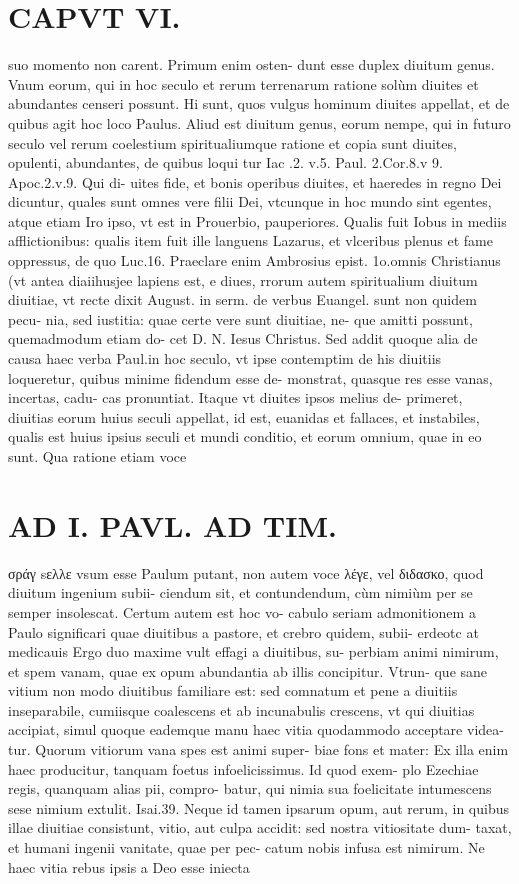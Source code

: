 \documentclass{article}
\begin{document}
\begin{pages}
\section*{CAPVT  VI. }
\marginpar{[ p.495 ]}\pstart suo momento non carent. Primum enim osten- dunt esse duplex diuitum genus. Vnum eorum, qui in hoc seculo et rerum terrenarum ratione solùm diuites et abundantes censeri possunt. Hi sunt, quos vulgus hominum diuites appellat, et de quibus agit hoc loco Paulus. Aliud est diuitum genus, eorum nempe, qui in futuro seculo vel rerum coelestium spiritualiumque  ratione et copia sunt diuites, opulenti, abundantes, de quibus loqui tur Iac .2. v.5. Paul. 2.Cor.8.v 9. Apoc.2.v.9. Qui di- uites fide, et bonis operibus diuites, et haeredes in regno Dei dicuntur, quales sunt omnes vere filii Dei, vtcunque in hoc mundo sint egentes, atque etiam Iro ipso, vt est in Prouerbio, pauperiores. Qualis fuit Iobus in mediis afflictionibus: qualis item fuit ille languens Lazarus, et vlceribus plenus et fame oppressus, de quo Luc.16. Praeclare enim Ambrosius epist. 1o.omnis Christianus (vt antea diaiihusjee lapiens est, e diues, rrorum autem spiritualium diuitum diuitiae, vt recte dixit August. in serm. de verbus  Euangel. sunt non quidem pecu- nia, sed iustitia: quae certe vere sunt diuitiae, ne- que amitti possunt, quemadmodum etiam do- cet D. N. Iesus Christus.  \pend\pstart Sed addit quoque alia de causa haec verba Paul.in hoc seculo, vt ipse contemptim de his diuitiis loqueretur, quibus minime fidendum esse de- monstrat, quasque res esse vanas, incertas, cadu- cas pronuntiat. Itaque vt diuites ipsos melius de- primeret, diuitias eorum huius seculi appellat, id est, euanidas et fallaces, et instabiles, qualis est huius ipsius seculi et mundi conditio, et eorum omnium, quae in eo sunt. Qua ratione etiam voce  \pend
\section*{AD I. PAVL. AD TIM. }
\marginpar{[ p.490 ]}\pstart σράγ sελλε vsum esse Paulum putant, non autem voce λέγε, vel διδασκο, quod diuitum ingenium subii- ciendum sit, et contundendum, cùm nimiùm per se semper insolescat. Certum autem est hoc vo- cabulo seriam admonitionem a Paulo significari quae diuitibus a pastore, et crebro quidem, subii- erdeotc at medicauis  \pend\pstart Ergo duo maxime vult effagi a diuitibus, su- perbiam animi nimirum, et spem vanam, quae ex opum abundantia ab illis concipitur. Vtrun- que sane vitium non modo diuitibus familiare est: sed comnatum et pene a diuitiis inseparabile, cumiisque coalescens et ab incunabulis crescens, vt qui diuitias accipiat, simul quoque eademque  manu haec vitia quodammodo acceptare videa- tur. Quorum vitiorum vana spes est animi super- biae fons et mater: Ex illa enim haec producitur, tanquam foetus infoelicissimus. Id quod exem- plo Ezechiae regis, quanquam alias pii, compro- batur, qui nimia sua foelicitate intumescens sese nimium extulit. Isai.39. Neque id tamen ipsarum opum, aut rerum, in quibus illae diuitiae consistunt, vitio, aut culpa accidit: sed nostra vitiositate dum- taxat, et humani ingenii vanitate, quae per pec- catum nobis infusa est nimirum.  \pend\pstart Ne haec vitia rebus ipsis a Deo esse iniecta  \pend

\end{pages}
\end{document}
